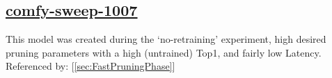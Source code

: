 \documentclass[11pt]{report}
\begin{document}
\subsection*{\protect\href{https://wandb.ai/samfh/Resnet56-Filters-Test/runs/58wpdzct/overview?workspace=}{\underline{\color{blue}comfy-sweep-1007}}}\label{sec:comfy-sweep-1007}
This model was created during the `no-retraining' experiment, high desired pruning parameters with a high (untrained) Top1, and fairly low Latency. \\
Referenced by: [\ref{sec:FastPruningPhase}]
\begin{figure}[H]
    \begin{table}[H]
        \centering
        \hspace{2em}
    \end{table}    
\end{figure}
\end{document}
